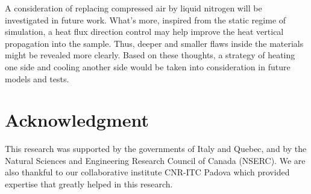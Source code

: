\documentclass{tQRT2e}
\begin{document}
A consideration of replacing compressed air by liquid nitrogen will be investigated in future work. What’s more, inspired from the static regime of simulation, a heat flux direction control may help improve the heat vertical propagation into the sample. Thus, deeper and smaller flaws inside the materials might be revealed more clearly. Based on these thoughts, a strategy of heating one side and cooling another side would be taken into consideration in future models and tests.


\section*{Acknowledgment}
This research was supported by the governments of Italy and Quebec, and by the Natural Sciences and Engineering Research Council of Canada (NSERC). We are also thankful to our collaborative institute CNR-ITC Padova which provided expertise that greatly helped in this research. 








\end{document}

